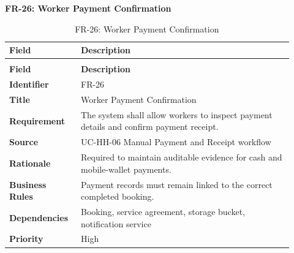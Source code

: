 \documentclass[12pt,a4paper]{article}
\begin{document}
\noindent\textbf{FR-26: Worker Payment Confirmation}\par
\vspace{4pt}
\begingroup\small\setlength{\tabcolsep}{4pt}\renewcommand{\arraystretch}{1.15}
\begin{longtable}{|>{\raggedright\arraybackslash}p{0.22\linewidth}|>{\raggedright\arraybackslash}p{0.70\linewidth}|}
\caption{FR-26: Worker Payment Confirmation}\label{tab:fr-26}\\
\hline
\textbf{Field} & \textbf{Description} \\ \hline
\endfirsthead
\multicolumn{2}{c}{Table \thetable\ Worker Payment Confirmation (continued)}\\
\hline
\textbf{Field} & \textbf{Description} \\ \hline
\endhead
\textbf{Identifier} & FR-26 \\ \hline
\textbf{Title} & Worker Payment Confirmation \\ \hline
\textbf{Requirement} & The system shall allow workers to inspect payment details and confirm payment receipt. \\ \hline
\textbf{Source} & UC-HH-06 Manual Payment and Receipt workflow \\ \hline
\textbf{Rationale} & Required to maintain auditable evidence for cash and mobile-wallet payments. \\ \hline
\textbf{Business Rules} & Payment records must remain linked to the correct completed booking. \\ \hline
\textbf{Dependencies} & Booking, service agreement, storage bucket, notification service \\ \hline
\textbf{Priority} & High \\ \hline
\end{longtable}
\endgroup
\clearpage
\end{document}
